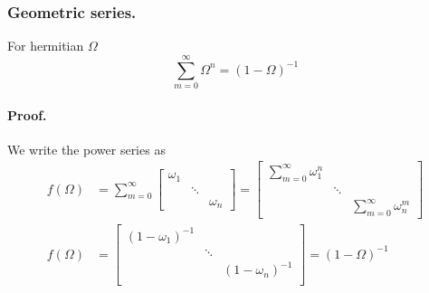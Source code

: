 \documentclass[../main.tex]{subfiles}
\begin{document}
\subsubsection*{Geometric series.}
For hermitian $\Omega$
\begin{equation*}
	\sum_{m=0}^{\infty}\Omega^n=(1-\Omega)^{-1}
\end{equation*}

\paragraph*{Proof.}
We write the power series as
\begin{align*}
	f(\Omega) & =\sum_{m=0}^{\infty}
	\begin{bmatrix}
		\omega_1 &        &          \\
		         & \ddots &          \\
		         &        & \omega_n
	\end{bmatrix}
	=
	\begin{bmatrix}
		\sum_{m=0}^{\infty}\omega_1^n &        &                               \\
		                              & \ddots &                               \\
		                              &        & \sum_{m=0}^{\infty}\omega_n^m
	\end{bmatrix} \\
	f(\Omega) & =
	\begin{bmatrix}
		(1-\omega_1)^{-1} &        &                   \\
		                  & \ddots &                   \\
		                  &        & (1-\omega_n)^{-1} \\
	\end{bmatrix}
	=(1-\Omega)^{-1}
\end{align*}
\end{document}
